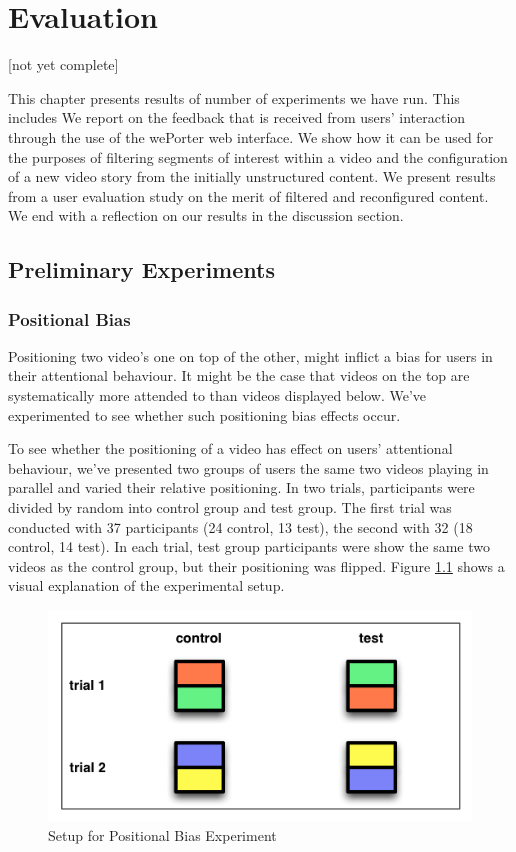 \chapter{Evaluation}
\label{ch:evaluation}
[not yet complete]

This chapter presents results of number of experiments we have run. This includes 
We report on the feedback that is received from users' interaction through the use of the wePorter web interface. We show how it can be used for the purposes of filtering segments of interest within a video and the configuration of a new video story from the initially unstructured content. We present results from a user evaluation study on the merit of filtered and reconfigured content. We end with a reflection on our results in the discussion section.




\section{Preliminary Experiments}
\label{sec:preliminary_experiments}

\subsection{Positional Bias}
Positioning two video's one on top of the other, might inflict a bias for users in their attentional behaviour. It might be the case that videos on the top are systematically more attended to than videos displayed below. We've experimented to see whether such positioning bias effects occur.

To see whether the positioning of a video has effect on users' attentional behaviour, we've presented two groups of users the same two videos playing in parallel and varied their relative positioning. In two trials, participants were divided by random into control group and test group. The first trial was conducted with 37 participants (24 control, 13 test), the second with 32 (18 control, 14 test). In each trial, test group participants were show the same two videos as the control group, but their positioning was flipped. Figure \ref{fig:exp_posbias} shows a visual explanation of the experimental setup.

\begin{figure}[htbp]
  \centering
    \includegraphics[width = .7\textwidth]{img/exp_posbias}
  \caption{Setup for Positional Bias Experiment}
  \label{fig:exp_posbias}
\end{figure}


